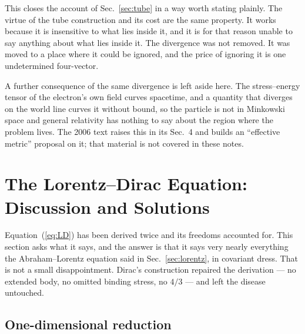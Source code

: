 \documentclass[preprint]{aastex701}
\begin{document}
This closes the account of Sec.~\ref{sec:tube} in a way worth stating plainly.
The virtue of the tube construction and its cost are the same property. It works
because it is insensitive to what lies inside it, and it is for that reason
unable to say anything about what lies inside it. The divergence was not
removed. It was moved to a place where it could be ignored, and the price of
ignoring it is one undetermined four-vector.

A further consequence of the same divergence is left aside here. The
stress--energy tensor of the electron's own field curves spacetime, and a
quantity that diverges on the world line curves it without bound, so the
particle is not in Minkowski space and general relativity has nothing to say
about the region where the problem lives. The 2006 text raises this in its
Sec.~4 and builds an ``effective metric'' proposal on it; that material is not
covered in these notes.

\section{The Lorentz--Dirac Equation: Discussion and Solutions}
\label{sec:LDdisc}

Equation~(\ref{eq:LD}) has been derived twice and its freedoms accounted for.
This section asks what it says, and the answer is that it says very nearly
everything the Abraham--Lorentz equation said in Sec.~\ref{sec:lorentz}, in
covariant dress. That is not a small disappointment. Dirac's construction
repaired the derivation --- no extended body, no omitted binding stress, no
$4/3$ --- and left the disease untouched.

\subsection{One-dimensional reduction}
\label{sec:1dreduction}
\end{document}
